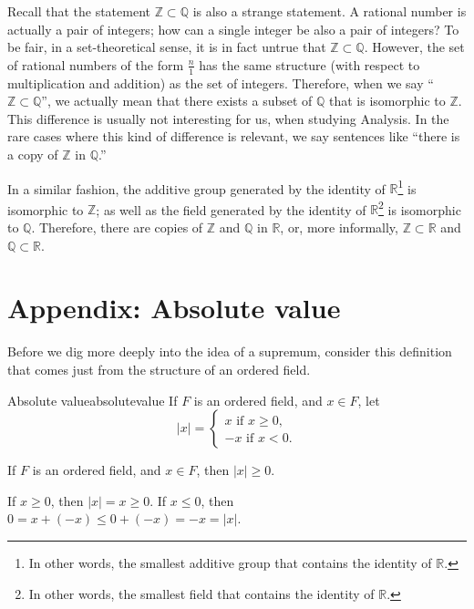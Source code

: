 Recall that the statement \(\mathbb{Z} \subset \mathbb{Q}\) is also a strange statement. A rational number is actually a pair of integers; how can a single integer be also a pair of integers? To be fair, in a set-theoretical sense, it is in fact untrue that \(\mathbb{Z} \subset \mathbb{Q}\). However, the set of rational numbers of the form \(\frac{n}{1}\) has the same structure (with respect to multiplication and addition) as the set of integers. Therefore, when we say ``\(\mathbb{Z} \subset \mathbb{Q}\)'', we actually mean that there exists a subset of \(\mathbb{Q}\) that is isomorphic to \(\mathbb{Z}\). This difference is usually not interesting for us, when studying Analysis. In the rare cases where this kind of difference is relevant, we say sentences like ``there is a copy of \(\mathbb{Z}\) in \(\mathbb{Q}\).''

In a similar fashion, the additive group generated by the identity of \(\mathbb{R}\)\footnote{In other words, the smallest additive group that contains the identity of \(\mathbb{R}\).} is isomorphic to \(\mathbb{Z}\); as well as the field generated by the identity of \(\mathbb{R}\)\footnote{In other words, the smallest field that contains the identity of \(\mathbb{R}\).} is isomorphic to \(\mathbb{Q}\). Therefore, there are copies of \(\mathbb{Z}\) and \(\mathbb{Q}\) in \(\mathbb{R}\), or, more informally, \(\mathbb{Z} \subset \mathbb{R}\) and \(\mathbb{Q} \subset \mathbb{R}\).

\section{Appendix: Absolute value}

Before we dig more deeply into the idea of a supremum, consider this definition that comes just from the structure of an ordered field.

\begin{defn}{Absolute value}{absolutevalue}
	If \(F\) is an ordered field, and \(x \in F\), let \[
		|x| =
		\begin{cases}
			x \text{\ if\ } x \geq 0\text{,} \\
			-x \text{\ if\ } x < 0\text{.}
		\end{cases}
	\]
\end{defn}

\begin{thm}{}{}
	If \(F\) is an ordered field, and \(x \in F\), then \(|x| \geq 0\).
\end{thm}

\begin{dem}{}{}
	If \(x \geq 0\), then \(|x| = x \geq 0\).
	If \(x \leq 0\), then \(0 = x + (-x) \leq 0 + (-x) = -x = |x|\).
\end{dem}

